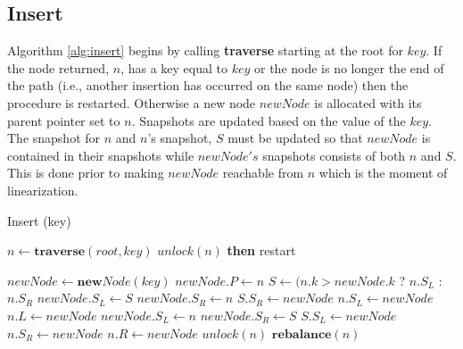 \documentclass[conference]{IEEEtran}
\theoremstyle{definition}
\theoremstyle{theorem}
\begin{document}
\subsection{Insert}
Algorithm \ref{alg:insert} begins by calling \textbf{traverse} starting at the root for $key$. If the node returned, $n$, has a key equal to $key$ or the node is no longer the end of the path (i.e., another insertion has occurred on the same node) then the procedure is restarted. Otherwise a new node $newNode$ is allocated with its parent pointer set to $n$. Snapshots are updated based on the value of the $key$. The snapshot for $n$ and $n$'s snapshot, $S$ must be updated so that $newNode$ is contained in their snapshots while $newNode's$ snapshots consists of both $n$ and $S$. This is done prior to making $newNode$ reachable from $n$ which is the moment of linearization. 
\begin{algorithm}[t]
\caption{Insert (key)}
\label{alg:insert}
\begin{algorithmic}[1]
\State $n\gets \mathbf{traverse}(root, key)$
	\State $unlock(n)$ \textbf{then} restart
\EndIf

\State $newNode\gets \mathbf{new} Node(key)$
\State $newNode.P \gets n$
\State $S \gets (n.k > newNode.k$ ? $n.S_L$ : $n.S_R$
\label{alg:insert:snaps}
	\State $newNode.S_L \gets S$
	\State $newNode.S_R \gets n$
	\State $S.S_R \gets newNode$
	\State $n.S_L \gets newNode$
	\State $n.L \gets newNode$
\Else
	\State $newNode.S_L \gets n$
	\State $newNode.S_R \gets S$
	\State $S.S_L \gets newNode$
	\State $n.S_R \gets newNode$
	\State $n.R \gets newNode$
\EndIf
\State $unlock(n)$
 $\mathbf{rebalance}(n)$
\EndIf
\end{algorithmic}
\end{algorithm}
\end{document}
